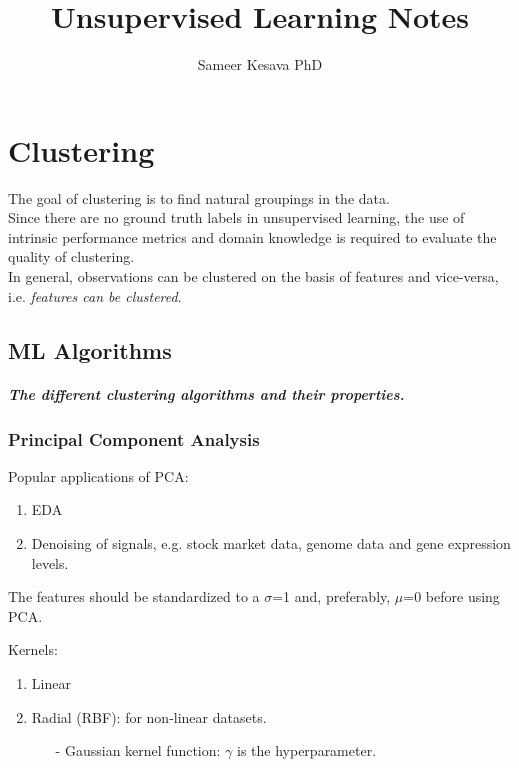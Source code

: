 \documentclass[a4paper, 12pt]{report}
\begin{document}
\title{Unsupervised Learning Notes}
\author{Sameer Kesava PhD}
\maketitle

\tableofcontents
\newpage



\chapter{Clustering}
The goal of clustering is to find natural groupings in the data.
\\

Since there are no ground truth labels in unsupervised learning, the use of intrinsic performance metrics and domain knowledge is required to evaluate the quality of clustering.\\

In general, observations can be clustered on the basis of features and vice-versa, i.e. \textit{features can be clustered}.
\section{ML Algorithms}
\paragraph{The different clustering algorithms and their properties.}

\subsection{Principal Component Analysis}
\label{PCA}

Popular applications of PCA:
\begin{enumerate}
\item EDA
\item Denoising of signals, e.g. stock market data, genome data and gene expression levels.
\end{enumerate}

The features should be standardized to a $\sigma$=1 and, preferably, $\mu$=0 before using PCA. 

\vspace{12pt}
Kernels:
\begin{enumerate} %

\item Linear
\item Radial (RBF): for non-linear datasets.
\begin{itemize}
\item[-] Gaussian kernel function: $\gamma$ is the hyperparameter.
\end{itemize}

\end{enumerate}
\end{document}
